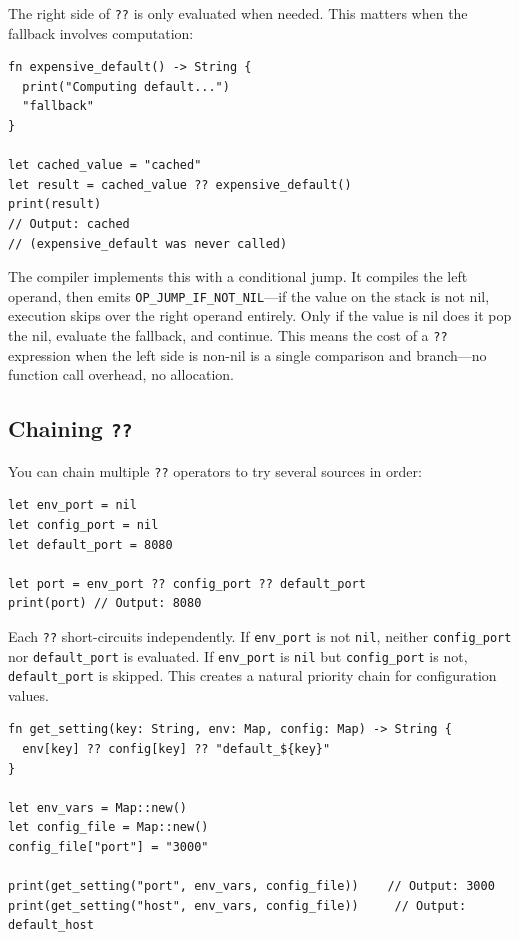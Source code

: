 The right side of \lstinline|??| is only evaluated when needed. This matters when the fallback involves computation:

\begin{lstlisting}[language=Lattice, caption={Short-circuit evaluation in action}]
fn expensive_default() -> String {
  print("Computing default...")
  "fallback"
}

let cached_value = "cached"
let result = cached_value ?? expensive_default()
print(result)
// Output: cached
// (expensive_default was never called)
\end{lstlisting}

The compiler implements this with a conditional jump. It compiles the left operand, then emits \lstinline|OP_JUMP_IF_NOT_NIL|---if the value on the stack is not nil, execution skips over the right operand entirely. Only if the value is nil does it pop the nil, evaluate the fallback, and continue. This means the cost of a \lstinline|??| expression when the left side is non-nil is a single comparison and branch---no function call overhead, no allocation.

\subsection{Chaining \texttt{??}}\label{sec:nil-coalesce-chaining}

You can chain multiple \lstinline|??| operators to try several sources in order:

\begin{lstlisting}[language=Lattice, caption={Chaining nil-coalescing operators}]
let env_port = nil
let config_port = nil
let default_port = 8080

let port = env_port ?? config_port ?? default_port
print(port) // Output: 8080
\end{lstlisting}

Each \lstinline|??| short-circuits independently. If \lstinline|env_port| is not \lstinline|nil|, neither \lstinline|config_port| nor \lstinline|default_port| is evaluated. If \lstinline|env_port| is \lstinline|nil| but \lstinline|config_port| is not, \lstinline|default_port| is skipped. This creates a natural priority chain for configuration values.

\begin{lstlisting}[language=Lattice, caption={A practical configuration lookup}]
fn get_setting(key: String, env: Map, config: Map) -> String {
  env[key] ?? config[key] ?? "default_${key}"
}

let env_vars = Map::new()
let config_file = Map::new()
config_file["port"] = "3000"

print(get_setting("port", env_vars, config_file))    // Output: 3000
print(get_setting("host", env_vars, config_file))     // Output: default_host
\end{lstlisting}

